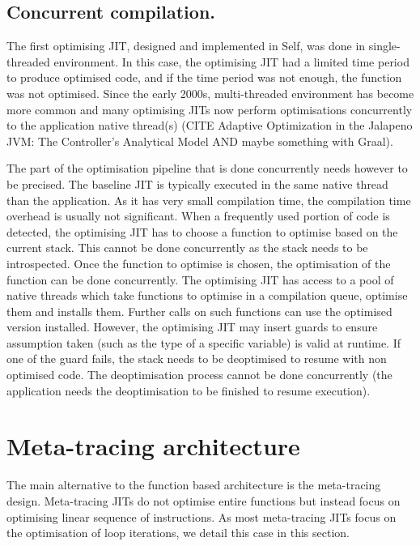 \documentclass[a4paper,12pt,twoside]{../includes/ThesisStyle}
\begin{document}
\subsection{Concurrent compilation.}

The first optimising JIT, designed and implemented in Self, was done in single-threaded environment. In this case, the optimising JIT had a limited time period to produce optimised code, and if the time period was not enough, the function was not optimised. Since the early 2000s, multi-threaded environment has become more common and many optimising JITs now perform optimisations concurrently to the application native thread(s) (CITE Adaptive Optimization in the Jalapeno JVM: The Controller's Analytical Model AND maybe something with Graal).

The part of the optimisation pipeline that is done concurrently needs however to be precised. The baseline JIT is typically executed in the same native thread than the application. As it has very small compilation time, the compilation time overhead is usually not significant. When a frequently used portion of code is detected, the optimising JIT has to choose a function to optimise based on the current stack. This cannot be done concurrently as the stack needs to be introspected. Once the function to optimise is chosen, the optimisation of the function can be done concurrently. The optimising JIT has access to a pool of native threads which take functions to optimise in a compilation queue, optimise them and installs them. Further calls on such functions can use the optimised version installed. However, the optimising JIT may insert guards to ensure assumption taken (such as the type of a specific variable) is valid at runtime. If one of the guard fails, the stack needs to be deoptimised to resume with non optimised code. The deoptimisation process cannot be done concurrently (the application needs the deoptimisation to be finished to resume execution). 


\section{Meta-tracing architecture}
\label{sec:metaArchitecture}

The main alternative to the function based architecture is the meta-tracing design. Meta-tracing JITs do not optimise entire functions but instead focus on optimising linear sequence of instructions. As most meta-tracing JITs focus on the optimisation of loop iterations, we detail this case in this section.
\end{document}
